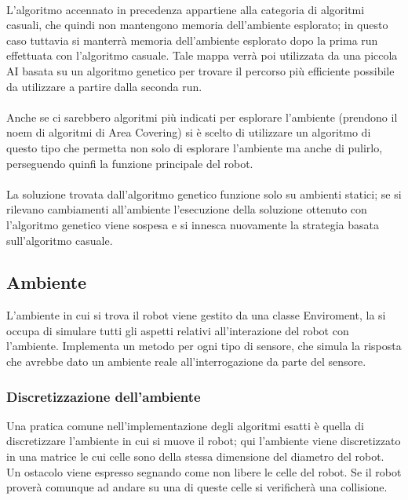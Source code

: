\documentclass{article}
\begin{document}
\paragraph{}
L'algoritmo accennato in precedenza appartiene alla categoria di algoritmi casuali, che quindi non mantengono memoria dell'ambiente esplorato; in questo caso tuttavia si manterrà  memoria dell'ambiente esplorato dopo la prima run effettuata con l'algoritmo casuale. Tale mappa verrà poi utilizzata da una piccola AI basata su un algoritmo genetico per trovare il percorso più efficiente possibile da utilizzare a partire dalla seconda run.

\paragraph{}
Anche se ci sarebbero algoritmi più indicati per esplorare l'ambiente (prendono il noem di algoritmi di Area Covering) si è scelto di utilizzare un algoritmo di questo tipo che permetta non solo di esplorare l'ambiente ma anche di pulirlo, perseguendo quinfi la funzione principale del robot.

\paragraph{}
La soluzione trovata dall'algoritmo genetico funzione solo su ambienti statici; se si rilevano cambiamenti all'ambiente l'esecuzione della soluzione ottenuto con l'algoritmo genetico viene sospesa e si innesca nuovamente la strategia basata sull'algoritmo casuale.
\subsection{Ambiente}
L'ambiente in cui si trova il robot viene gestito da una classe Enviroment, la si occupa di simulare tutti gli aspetti relativi all'interazione del robot con l'ambiente. Implementa un metodo per ogni tipo di sensore, che simula la risposta che avrebbe dato un ambiente reale all'interrogazione da parte del sensore.
\subsubsection{Discretizzazione dell'ambiente}
Una pratica comune nell'implementazione degli algoritmi esatti è quella di discretizzare l'ambiente in cui si muove il robot; qui l'ambiente viene discretizzato in una matrice le cui celle sono della stessa dimensione del diametro del robot. Un ostacolo viene espresso segnando come non libere le celle del robot. Se il robot proverà comunque ad andare su una di queste celle si verificherà una collisione. 
\end{document}
